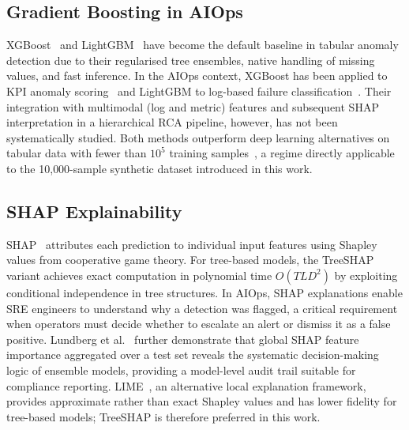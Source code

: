 \documentclass[5p, times]{elsarticle}
\begin{document}
\subsection{Gradient Boosting in AIOps}
XGBoost~\cite{xgboost2016} and LightGBM~\cite{lightgbm2017} have
become the default baseline in tabular anomaly detection due to their regularised tree ensembles, native handling of missing values, and fast inference. In the AIOps context, XGBoost has been applied to KPI anomaly scoring~\cite{zhang2019cross} and LightGBM to log-based failure classification~\cite{he2016evaluation}. Their
integration with multimodal (log and metric) features and subsequent SHAP interpretation in a hierarchical RCA pipeline, however, has not been systematically studied. Both methods outperform deep learning alternatives on tabular data with fewer than $10^5$ training samples~\cite{grinsztajn2022tree}, a regime directly applicable to the 10{,}000-sample synthetic dataset introduced in this work.

\subsection{SHAP Explainability}
SHAP~\cite{shap2017} attributes each prediction to individual input features using Shapley values from cooperative game theory. For tree-based models, the TreeSHAP variant achieves exact computation in polynomial time $O(TLD^2)$ by exploiting conditional independence in tree structures. In AIOps, SHAP explanations enable SRE engineers to understand why a detection was flagged, a critical requirement when operators must decide whether to escalate an alert or dismiss it as a false positive. Lundberg et al.~\cite{lundberg2020local2global} further demonstrate that global SHAP feature importance aggregated over a test set reveals the systematic decision-making logic of ensemble models, providing a
model-level audit trail suitable for compliance reporting. LIME~\cite{ribeiro2016lime}, an alternative local explanation framework, provides approximate rather than exact Shapley values and has lower fidelity for tree-based models; TreeSHAP is therefore preferred in this work.
\end{document}
